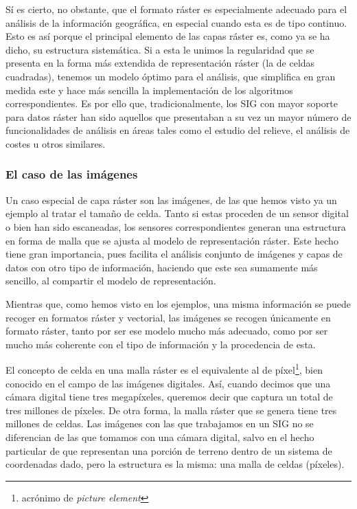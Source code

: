 \begin{multicols}{2}
Sí es cierto, no obstante, que el formato ráster es especialmente adecuado para el análisis de la información geográfica, en especial cuando esta es de tipo continuo. Esto es así porque el principal elemento de las capas ráster es, como ya se ha dicho, su estructura sistemática. Si a esta le unimos la regularidad que se presenta en la forma más extendida de representación ráster (la de celdas cuadradas), tenemos un modelo óptimo para el análisis, que simplifica en gran medida este y hace más sencilla la implementación de los algoritmos correspondientes. Es por ello que, tradicionalmente, los SIG con mayor soporte para datos ráster han sido aquellos que presentaban a su vez un mayor número de funcionalidades de análisis en áreas tales como el estudio del relieve, el análisis de costes u otros similares.

\subsubsection{El caso de las imágenes}

Un caso especial de capa ráster son las imágenes, de las que hemos visto ya un ejemplo al tratar el tamaño de celda. Tanto si estas proceden de un sensor digital o bien han sido escaneadas, los sensores correspondientes generan una estructura en forma de malla que se ajusta al modelo de representación ráster. Este hecho tiene gran importancia, pues facilita el análisis conjunto de imágenes y capas de datos con otro tipo de información, haciendo que este sea sumamente más sencillo, al compartir el modelo de representación.

Mientras que, como hemos visto en los ejemplos, una misma información se puede recoger en formatos ráster y vectorial, las imágenes se recogen únicamente en formato ráster, tanto por ser ese modelo mucho más adecuado, como por ser mucho más coherente con el tipo de información y la procedencia de esta.

El concepto de celda en una malla ráster es el equivalente al de píxel\footnote{acrónimo de \emph{picture element}}, bien conocido en el campo de las imágenes digitales. Así, cuando decimos que una cámara digital tiene tres megapíxeles, queremos decir que captura un total de tres millones de píxeles. De otra forma, la malla ráster que se genera tiene tres millones de celdas. Las imágenes con las que trabajamos en un SIG no se diferencian de las que tomamos con una cámara digital, salvo en el hecho particular de que representan una porción de terreno dentro de un sistema de coordenadas dado, pero la estructura es la misma: una malla de celdas (píxeles).


\end{multicols}

